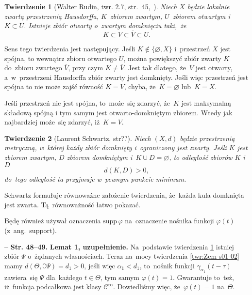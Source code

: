 \documentclass[a4paper,11pt]{article}
\newtheorem{twr}{Twierdzenie}
\newcommand{\spaceThree}{0.5em}
\let\emptyset\varnothing
\newcommand{\ol}{\overline}
\newcommand{\mr}{\mathrm}
\newcommand{\mc}{\mathcal}
\newcommand{\al}{\alpha}
\newcommand{\ga}{\gamma}
\newcommand{\vp}{\varphi}
\newcommand{\Cc}{\mc{C}}
\newcommand{\es}{\emptyset}
\newcommand{\subs}{\subset}
\newcommand{\com}{\complement}
\newcommand{\Cinfty}{\Cc^{ \infty }}
\newcommand{\supp}{\mr{supp}\,}
\newcommand{\tb}{\textbf}
\newcommand{\noi}{\noindent}
\newcommand{\start}{\noi \tb{--} {}}
\newcommand{\Str}[1]{\tb{Str. #1.}}
\newcommand{\vpt}{\vp( t )}
\begin{document}
\begin{twr}[Walter Rudin, twr. 2.7, str.~45,~\cite{Rudin98}]
  \label{twr:Zem-s01-01}
  Niech $X$ będzie lokalnie zwartą przestrzenią Hausdorffa,
  $K$~zbiorem zwartym, $U$~zbiorem otwartym i~$K \subs U$. Istnieje
  zbiór otwarty o~zwartym domknięciu taki,~że
  \begin{equation}
    \label{eq:Zem-s01-04}
    K \subs V \subs \ol{ V } \subs U.
  \end{equation}
\end{twr}
Sens tego twierdzenia jest następujący. Jeśli $K \notin \{ \es, X \}$
i~przestrzeń $X$ jest spójna, to wewnątrz zbioru otwartego $U$, można
powiększyć zbiór zwarty $K$ do~zbioru zwartego $\ol{ V }$, przy czym
$K \neq \ol{ V }$. Jest tak dlatego, że~$V$ jest otwarty,
a~w~przestrzeni Hausdorffa zbiór zwarty jest domknięty. Jeśli więc
przestrzeń jest spójna to nie może zajść równość $K = V$, chyba,
że~$K = \es$ lub~$K = X$.

Jeśli przestrzeń nie jest spójna, to~może~się zdarzyć, że~$K$ jest
maksymalną składową spójną i tym samym jest otwarto-domkniętym
zbiorem. Wtedy jak najbardziej może~się zdarzyć, iż~$K = V$.

\begin{twr}[Laurent Schwartz, str??\cite{Schwartz79}]
  \label{twr:Zem-s01-02}
  Niech $( X, d )$ będzie przestrzenią metryczną, w~której każdy zbiór
  domknięty i~ograniczony jest zwarty. Jeśli $K$ jest zbiorem zwartym,
  $D$ zbiorem domkniętym i~$K \cup D = \es$, to odległość zbiorów $K$
  i~$D$
  \begin{equation}
    \label{eq:Zem-s01-05}
    d( K, D ) > 0,
  \end{equation}
  do~tego odległość ta przyjmuje w~pewnym punkcie minimum.
\end{twr}
\noi Schwartz formułuje równoważne założenie twierdzenia, że~każda
kula domknięta jest zwarta. Tą~równoważność łatwo pokazać.

Będę również używał oznaczenia $\supp \vp$ na~oznaczenie nośnika
funkcji $\vpt$ (z~ang.~support).

\vspace{\spaceThree}


\start \Str{48--49} \tb{Lemat 1, uzupełnienie.} Na~podstawie
twierdzenia \ref{twr:Zem-s01-01} istniej zbiór $\Psi$ o~żądanych
własnościach. Teraz na~mocy twierdzenia \eqref{twr:Zem-s01-02} mamy
$d( \Theta, \com \Psi ) = d_{ 1 } > 0$, jeśli więc
$\al_{ 1 } < d_{ 1 }$, to~nośnik funkcji
$\ga_{ \al_{ 1 } }( t - \tau )$ zawiera~się $\Psi$ dla~każdego
$t \in \Theta$, tym samym $\vp( t ) = 1$. Gwarantuje to~też,
iż~funkcja podcałkowa jest klasy $\Cinfty$. Dowiedliśmy więc,
że~$\vp( t ) = 1$ na~$\Theta$.
\end{document}
